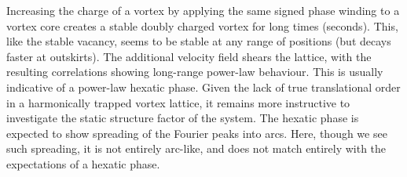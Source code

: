Increasing the charge of a vortex by applying the same signed phase winding to a vortex core creates a stable doubly charged vortex for long
times (seconds). This, like the stable vacancy, seems to be stable at any range of positions (but decays faster at outskirts). The additional
velocity field shears the lattice, with the resulting correlations showing long-range power-law behaviour. This is usually indicative of a
power-law hexatic phase. Given the lack of true translational order in a harmonically trapped vortex lattice, it remains more instructive to
investigate the static structure factor of the system. The hexatic phase is expected to show spreading of the Fourier peaks into arcs. Here,
though we see such spreading, it is not entirely arc-like, and does not match entirely with the expectations of a hexatic phase.
